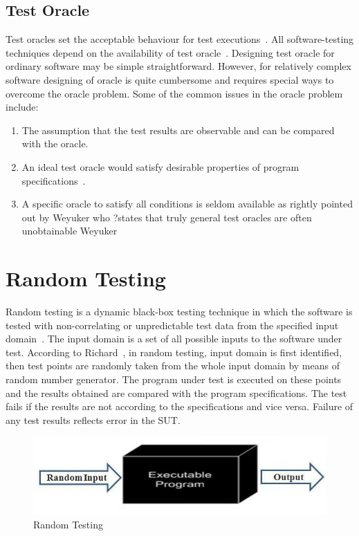 \subsection{Test Oracle}
Test oracles set the acceptable behaviour for test executions~\cite{baresi2001test}. All software-testing techniques depend on the availability of test oracle~\cite{gaudel2010software}. Designing test oracle for ordinary software may be simple straightforward. However, for relatively complex software designing of oracle is quite cumbersome and requires special ways to overcome the oracle problem. Some of the common issues in the oracle problem include:
\begin{enumerate}
\item The assumption that the test results are observable and can be compared with the oracle.
\item An ideal test oracle would satisfy desirable properties of program specifications~\cite{baresi2001test}.
\item A specific oracle to satisfy all conditions is seldom available as rightly pointed out by Weyuker who ?states that truly general test oracles are often unobtainable Weyuker~\cite{weyuker1982testing} 
\end{enumerate}



\section{Random Testing}
Random testing is a dynamic black-box testing technique in which the software is tested with non-correlating or unpredictable test data from the specified input domain~\cite{Chan2002}. The input domain is a set of all possible inputs to the software under test. According to Richard~\cite{hamlet1994}, in random testing, input domain is first identified, then test points are randomly taken from the whole input domain by means of random number generator. The program under test is executed on these points and the results obtained are compared with the program specifications. The test fails if the results are not according to the specifications and vice versa. Failure of any test results reflects error in the SUT.

\begin{figure}[h]
	\centering
	\includegraphics[scale=0.5]{chapter2/randomTesting.jpg}
	\caption{Random Testing}
\end{figure}


